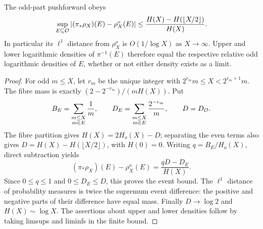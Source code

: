 \begin{proposition}\label{prop:sampling}
The odd-part pushforward obeys
\[
 \sup_{E\subseteq\mathcal O}|(\pi_*\rho_X)(E)-\rho_X^o(E)|
 \leq\frac{H(X)-H(\lfloor X/2\rfloor)}{H(X)}.
\]
In particular its $\ell^1$ distance from $\rho_X^o$ is $O(1/\log X)$
as $X\to\infty$.  Upper and lower logarithmic densities of
$\pi^{-1}(E)$ therefore equal the respective relative odd logarithmic
densities of $E$, whether or not either density exists as a limit.
\end{proposition}
\begin{proof}
For odd $m\leq X$, let $r_m$ be the unique integer with
$2^{r_m}m\leq X<2^{r_m+1}m$.  The fibre mass is exactly
$(2-2^{-r_m})/(mH(X))$.  Put
\[
 B_E=\sum_{\substack{m\leq X\\m\in E}}\frac1m,
 \qquad D_E=\sum_{\substack{m\leq X\\m\in E}}\frac{2^{-r_m}}m,
 \qquad D=D_{\mathcal O}.
\]
The fibre partition gives $H(X)=2H_o(X)-D$; separating the even terms
also gives $D=H(X)-H(\lfloor X/2\rfloor)$, with $H(0)=0$.
Writing $q=B_E/H_o(X)$, direct subtraction yields
\[
 (\pi_*\rho_X)(E)-\rho_X^o(E)=\frac{qD-D_E}{H(X)}.
\]
Since $0\leq q\leq1$ and $0\leq D_E\leq D$, this proves the event
bound.  The $\ell^1$ distance of probability measures is twice the
supremum event difference: the positive and negative parts of their
difference have equal mass.  Finally $D\to\log2$ and $H(X)\sim\log X$.
The assertions about upper and lower densities follow by taking limsups
and liminfs in the finite bound.
\end{proof}
